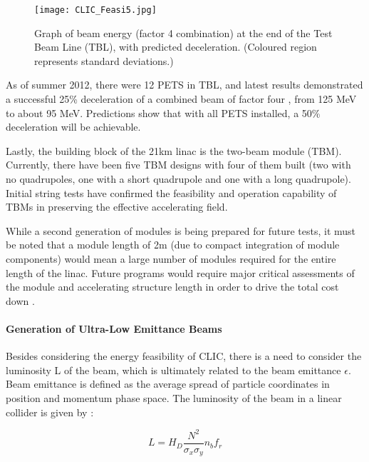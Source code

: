 \begin{figure}[!htb]
    \centering
    \texttt{[image: CLIC\_Feasi5.jpg]}
    
    \caption{Graph of beam energy (factor 4 combination) at the end of the Test Beam Line (TBL), with predicted deceleration. (Coloured region represents standard deviations.) \cite{IPAC:TwoBeamAcc}}
    \label{fig:CLIC:Feasi5}
\end{figure}

As of summer 2012, there were 12 PETS in TBL, and latest results demonstrated a successful 25\% deceleration of a combined beam of factor four \cite{IPAC:TwoBeamAcc}, from 125 MeV to about 95 MeV. Predictions show that with all PETS installed, a 50\% deceleration will be achievable.

Lastly, the building block of the 21km linac is the two-beam module (TBM). Currently, there have been five TBM designs with four of them built (two with no quadrupoles, one with a short quadrupole and one with a long quadrupole). Initial string tests have confirmed the feasibility and operation capability of TBMs in preserving the effective accelerating field.

While a second generation of modules is being prepared for future tests, it must be noted that a module length of 2m (due to compact integration of module components) would mean a large number of modules required for the entire length of the linac. Future programs would require major critical assessments of the module and accelerating structure length in order to drive the total cost down \cite{CLIC:Concept}.

\paragraph{Generation of Ultra-Low Emittance Beams}

Besides considering the energy feasibility of CLIC, there is a need to consider the luminosity L of the beam, which is ultimately related to the beam emittance $\epsilon$. Beam emittance is defined as the average spread of particle coordinates in position and momentum phase space. The luminosity of the beam in a linear collider is given by \cite{CLIC:Concept}:

\begin{equation}
    L = H_D \frac{N^2}{\sigma_x \sigma_y} n_b f_r
    \label{eq:BeamLuminosity}
\end{equation}

